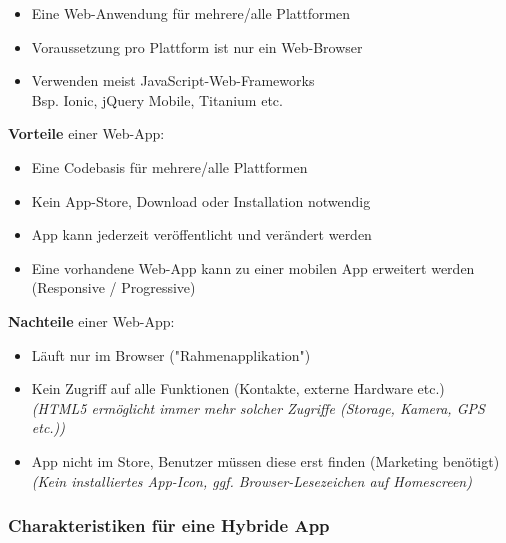 \documentclass[a4paper]{article}
\begin{document}
		\begin{itemize}
			\item Eine Web-Anwendung für mehrere/alle Plattformen
			\item Voraussetzung pro Plattform ist nur ein Web-Browser
			\item Verwenden meist JavaScript-Web-Frameworks\\
			Bsp. Ionic, jQuery Mobile, Titanium etc.
		\end{itemize}
		\vspace{1em}
		\textbf{Vorteile} einer Web-App:
		\begin{itemize}
			
			\item Eine Codebasis für mehrere/alle Plattformen
			
			\item Kein App-Store, Download oder Installation notwendig
			
			\item App kann jederzeit veröffentlicht und verändert werden
			
			\item Eine vorhandene Web-App kann zu einer mobilen App erweitert werden (Responsive / Progressive)
					
		\end{itemize}
		\vspace{1em}
		\textbf{Nachteile} einer Web-App:
		\begin{itemize}
			
			\item Läuft nur im Browser ("Rahmenapplikation")
			
			\item Kein Zugriff auf alle Funktionen (Kontakte, externe Hardware etc.)\\
					\textit{(HTML5 ermöglicht immer mehr solcher Zugriffe (Storage, Kamera, GPS etc.))}
					
			\item App nicht im Store, Benutzer müssen diese erst finden (Marketing benötigt)\\
					\textit{(Kein installiertes App-Icon, ggf. Browser-Lesezeichen auf Homescreen)}
			
		\end{itemize}
		
		\subsubsection{Charakteristiken für eine Hybride App}
		
\end{document}
